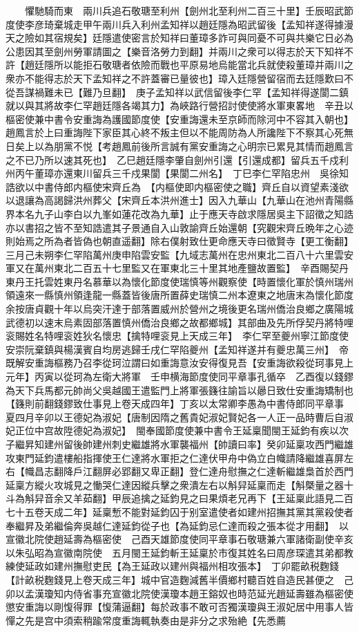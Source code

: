 　　懼馳騎而東　兩川兵追石敬瑭至利州【劍州北至利州二百三十里】壬辰昭武節度使李彦琦棄城走甲午兩川兵入利州孟知祥以趙廷隱為昭武留後【孟知祥遂得據漫天之險如其宿規矣】廷隱遣使密言於知祥曰董璋多詐可與同憂不可與共樂它日必為公患因其至劍州勞軍請圖之【樂音洛勞力到翻】并兩川之衆可以得志於天下知祥不許【趙廷隱所以能拒石敬瑭者依險而戰也平原易地烏能當北兵就使殺董璋并兩川之衆亦不能得志於天下孟知祥之不許蓋審已量彼也】璋入廷隱營留宿而去廷隱歎曰不從吾謀禍難未已【難乃旦翻】　庚子孟知祥以武信留後李仁罕【孟知祥得遂閬二鎮就以與其將故李仁罕趙廷隱各竭其力】為峽路行營招討使使將水軍東畧地　辛丑以樞密使兼中書令安重誨為護國節度使【安重誨還未至京師而除河中不容其入朝也】趙鳳言於上曰重誨陛下家臣其心終不叛主但以不能周防為人所讒陛下不察其心死無日矣上以為朋黨不悦【考趙鳳前後所言誠有黨安重誨之心明宗已累見其情而趙鳳言之不已乃所以速其死也】　乙巳趙廷隱李肇自劍州引還【引還成都】留兵五千戍利州丙午董璋亦還東川留兵三千戍果閬【果閬二州名】　丁巳李仁罕陷忠州　吳徐知誥欲以中書侍郎内樞使宋齊丘為　【内樞使即内樞密使之職】齊丘自以資望素淺欲以退讓為高謁歸洪州葬父【宋齊丘本洪州進士】因入九華山【九華山在池州青陽縣界本名九子山李白以九峯如蓮花改為九華】止于應天寺啟求隱居吳主下詔徵之知誥亦以書招之皆不至知誥遣其子景通自入山敦諭齊丘始還朝【究觀宋齊丘晩年之心迹則始焉之所為者皆偽也朝直遥翻】除右僕射致仕更命應天寺曰徵賢寺【更工衡翻】　三月己未朔李仁罕陷萬州庚申陷雲安監【九域志萬州在忠州東北二百八十六里雲安軍又在萬州東北二百五十七里監又在軍東北三十里其地產鹽故置監】　辛酉賜契丹東丹王托雲姓東丹名慕華以為懷化節度使瑞慎等州觀察使【時置懷化軍於慎州瑞州領遠來一縣慎州領逢龍一縣蓋皆後唐所置薛史瑞慎二州本遼東之地唐末為懷化節度余按唐貞觀十年以烏突汗達于部落置威州於營州之境後更名瑞州僑治良鄉之廣陽城武德初以速末烏素固部落置慎州僑治良鄉之故都鄉城】其部曲及先所俘契丹將特哩衮賜姓名特哩衮姓狄名懷忠【擒特哩衮見上天成三年】　李仁罕至夔州寧江節度使安崇阮棄鎮與楊漢賓自均房逃歸壬戌仁罕陷夔州【孟知祥遂并有夔忠萬三州】　帝既解安重誨樞務乃召李從珂泣謂曰如重誨意汝安得復見吾【安重誨欲殺從珂事見上元年】丙寅以從珂為左衛大將軍　壬申横海節度使同平章事孔循卒　乙酉復以錢鏐為天下兵馬都元帥尚父吳越國王遣監門上將軍張籛往諭旨以曏日致仕安重誨矯制也【籛則前翻錢鏐致仕事見上卷天成四年】丁亥以太常卿李愚為中書侍郎同平章事　夏四月辛卯以王德妃為淑妃【唐制因隋之舊貴妃淑妃賢妃各一人正一品時曹后自淑妃正位中宫故陞德妃為淑妃】　閩奉國節度使兼中書令王延稟聞閩王延鈞有疾以次子繼昇知建州留後帥建州刺史繼雄將水軍襲福州【帥讀曰率】癸卯延稟攻西門繼雄攻東門延鈞遣樓船指揮使王仁達將水軍拒之仁達伏甲舟中偽立白幟請降繼雄喜屏左右【幟昌志翻降戶江翻屏必郢翻又卑正翻】登仁達舟慰撫之仁達斬繼雄梟首於西門延稟方縱火攻城見之慟哭仁達因縱兵擊之衆潰左右以斛舁延稟而走【斛槩量之器十斗為斛舁音余又羊茹翻】甲辰追擒之延鈞見之曰果煩老兄再下【王延稟此語見二百七十五卷天成二年】延稟慙不能對延鈞囚于别室遣使者如建州招撫其黨其黨殺使者奉繼昇及弟繼倫奔吳越仁達延鈞從子也【為延鈞忌仁達而殺之張本從才用翻】　以宣徽北院使趙延壽為樞密使　己酉天雄節度使同平章事石敬瑭兼六軍諸衛副使辛亥以朱弘昭為宣徽南院使　五月閩王延鈞斬王延稟於市復其姓名曰周彦琛遣其弟都教練使延政如建州撫慰吏民【為王延政以建州與福州相攻張本】　丁卯罷畝税麴錢【計畝税麴錢見上卷天成三年】城中官造麴減舊半價鄉村聽百姓自造民甚便之　己卯以孟漢瓊知内侍省事充宣徽北院使漢瓊本趙王鎔奴也時范延光趙延壽雖為樞密使懲安重誨以剛愎得罪【愎蒲逼翻】每於政事不敢可否獨漢瓊與王淑妃居中用事人皆憚之先是宫中須索稍踰常度重誨輒執奏由是非分之求殆絶【先悉薦